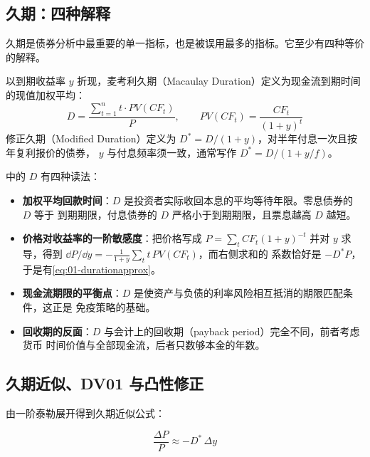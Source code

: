 \subsection{久期：四种解释}

久期是债券分析中最重要的单一指标，也是被误用最多的指标。它至少有四种等价的解释。

\begin{definition}[麦考利久期与修正久期]\label{def:01-duration}
以到期收益率 $y$ 折现，麦考利久期（Macaulay Duration）定义为现金流到期时间的现值加权平均：
\begin{equation}\label{eq:01-macaulay}
  D = \frac{\sum_{t=1}^{n} t \cdot PV(CF_t)}{P}, \qquad PV(CF_t) = \frac{CF_t}{(1+y)^t}
\end{equation}
修正久期（Modified Duration）定义为 $D^{*} = D/(1+y)$，对半年付息一次且按年复利报价的债券，
$y$ 与付息频率须一致，通常写作 $D^{*} = D/(1+y/f)$。
\end{definition}

 中的 $D$ 有四种读法：

\begin{itemize}[leftmargin=*]
  \item \textbf{加权平均回款时间}：$D$ 是投资者实际收回本息的平均等待年限。零息债券的 $D$ 等于
        到期期限，付息债券的 $D$ 严格小于到期期限，且票息越高 $D$ 越短。
  \item \textbf{价格对收益率的一阶敏感度}：把价格写成
        $P = \sum_t CF_t (1+y)^{-t}$ 并对 $y$ 求导，得到
        $\dd P/\dd y = -\frac{1}{1+y}\sum_t t\,PV(CF_t)$，而右侧求和的
        系数恰好是 $-D^{*}P$，于是有\cref{eq:01-durationapprox}。
  \item \textbf{现金流期限的平衡点}：$D$ 是使资产与负债的利率风险相互抵消的期限匹配条件，这正是
        免疫策略的基础。
  \item \textbf{回收期的反面}：$D$ 与会计上的回收期（payback period）完全不同，前者考虑货币
        时间价值与全部现金流，后者只数够本金的年数。
\end{itemize}

\subsection{久期近似、DV01 与凸性修正}

由一阶泰勒展开得到久期近似公式：

\begin{equation}\label{eq:01-durationapprox}
  \frac{\Delta P}{P} \approx -D^{*}\,\Delta y
\end{equation}

